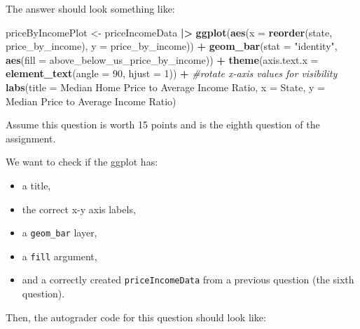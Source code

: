 \documentclass[
  12pt,
]{book}
\newenvironment{Shaded}{\begin{snugshade}}{\end{snugshade}}
\newcommand{\AttributeTok}[1]{\textcolor[rgb]{0.13,0.29,0.53}{#1}}
\newcommand{\CommentTok}[1]{\textcolor[rgb]{0.56,0.35,0.01}{\textit{#1}}}
\newcommand{\DecValTok}[1]{\textcolor[rgb]{0.00,0.00,0.81}{#1}}
\newcommand{\FunctionTok}[1]{\textcolor[rgb]{0.13,0.29,0.53}{\textbf{#1}}}
\newcommand{\NormalTok}[1]{#1}
\newcommand{\OtherTok}[1]{\textcolor[rgb]{0.56,0.35,0.01}{#1}}
\newcommand{\SpecialCharTok}[1]{\textcolor[rgb]{0.81,0.36,0.00}{\textbf{#1}}}
\newcommand{\StringTok}[1]{\textcolor[rgb]{0.31,0.60,0.02}{#1}}
\providecommand{\tightlist}{%
  \setlength{\itemsep}{0pt}\setlength{\parskip}{0pt}}
\begin{document}
The answer should look something like:

\begin{Shaded}
\begin{Highlighting}[]
\NormalTok{priceByIncomePlot }\OtherTok{\textless{}{-}}\NormalTok{ priceIncomeData }\SpecialCharTok{|\textgreater{}}
  \FunctionTok{ggplot}\NormalTok{(}\FunctionTok{aes}\NormalTok{(}\AttributeTok{x =} \FunctionTok{reorder}\NormalTok{(state, price\_by\_income), }\AttributeTok{y =}\NormalTok{ price\_by\_income)) }\SpecialCharTok{+}
  \FunctionTok{geom\_bar}\NormalTok{(}\AttributeTok{stat =} \StringTok{"identity"}\NormalTok{, }\FunctionTok{aes}\NormalTok{(}\AttributeTok{fill =}\NormalTok{ above\_below\_us\_price\_by\_income)) }\SpecialCharTok{+}
  \FunctionTok{theme}\NormalTok{(}\AttributeTok{axis.text.x =} \FunctionTok{element\_text}\NormalTok{(}\AttributeTok{angle =} \DecValTok{90}\NormalTok{, }\AttributeTok{hjust =} \DecValTok{1}\NormalTok{)) }\SpecialCharTok{+} \CommentTok{\#rotate x{-}axis values for visibility }
  \FunctionTok{labs}\NormalTok{(}\AttributeTok{title =} \StringTok{\textquotesingle{}Median Home Price to Average Income Ratio\textquotesingle{}}\NormalTok{, }\AttributeTok{x =} \StringTok{\textquotesingle{}State\textquotesingle{}}\NormalTok{, }\AttributeTok{y =} \StringTok{\textquotesingle{}Median Price to Average Income Ratio\textquotesingle{}}\NormalTok{)}
\end{Highlighting}
\end{Shaded}

Assume this question is worth 15 points and is the eighth question of the assignment.

We want to check if the ggplot has:

\begin{itemize}
\tightlist
\item
  a title,
\item
  the correct x-y axis labels,
\item
  a \texttt{geom\_bar} layer,
\item
  a \texttt{fill} argument,
\item
  and a correctly created \texttt{priceIncomeData} from a previous question (the sixth question).
\end{itemize}

Then, the autograder code for this question should look like:
\end{document}
